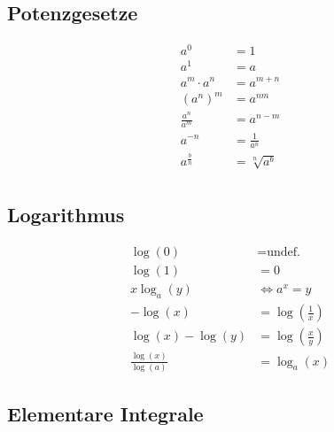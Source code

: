 \documentclass[11pt]{article}
\begin{document}
\begin{minipage}[c]{0.5\textwidth}
\subsection{Potenzgesetze}

\begin{equation*}
\begin{split}
	a^0 & = 1 \\
	a^1 & = a \\
	a^m \cdot a^n & = a^{m+n} \\
	(a^n)^m & = a^{nm} \\
	\frac{a^n}{a^m} & = a^{n-m} \\
	a^{-n} & = \frac{1}{a^n} \\
	a^{\frac{b}{n}} & = \sqrt[n]	{a^b} \\
\end{split}
\end{equation*}
\end{minipage}
%
\begin{minipage}[c]{0.5\textwidth}
\subsection{Logarithmus}

\begin{equation*}
\begin{split}
	\log(0) & = \text{undef.} \\
	\log(1) & = 0 \\
	x \log_a(y) & \Leftrightarrow a^x = y \\
	- \log(x) & = \log(\frac{1}{x}) \\
	\log(x) - \log(y) & = \log(\frac{x}{y}) \\
	\frac{\log(x)}{\log(a)} & = \log_a(x)
\end{split}
\end{equation*}
\end{minipage}

\subsection{Elementare Integrale}
\end{document}
